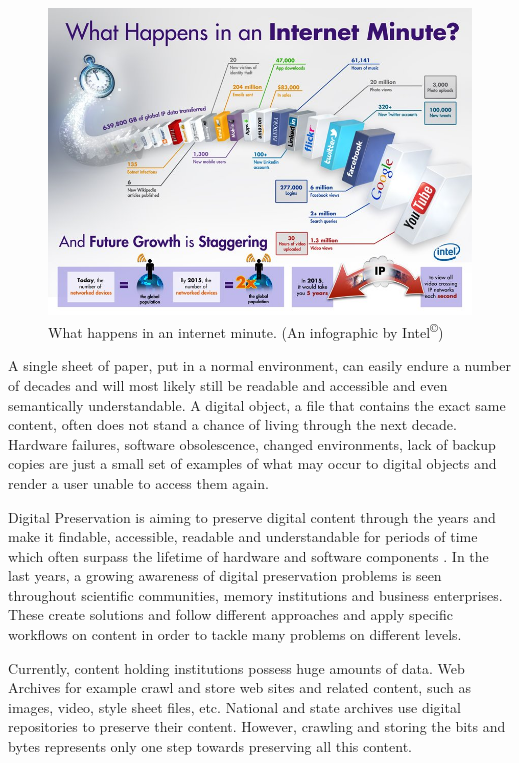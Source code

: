 \begin{figure}[th]
\begin{center}
\includegraphics[width=6in]{figures/introduction/intel_oneminute_internet.jpg}
\caption{What happens in an internet minute. (An infographic by Intel\textsuperscript{\copyright})}
\label{fig:intel_oneminute_internet}
\end{center}
\end{figure}

A single sheet of paper, put in a normal environment, can easily endure a number of decades and will most likely still be readable and accessible and even semantically understandable. A digital object, a file that contains the exact same content, often does not stand a chance of living through the next decade. Hardware failures, software obsolescence, changed environments, lack of backup copies are just a small set of examples of what may occur to digital objects and render a user unable to access them again.

Digital Preservation is aiming to preserve digital content through the years and make it findable, accessible, readable and understandable for periods of time which often surpass the lifetime of hardware and software components \cite{DBLP:journals/dlib/RosenthalRLRM05}. In the last years, a growing awareness of digital preservation problems is seen throughout scientific communities, memory institutions and business enterprises. These create solutions and follow different approaches and apply specific workflows on content in order to tackle many problems on different levels.

Currently, content holding institutions possess huge amounts of data. Web Archives for example crawl and store web sites and related content, such as images, video, style sheet files, etc. National and state archives use digital repositories to preserve their content. However, crawling and storing the bits and bytes represents only one step towards preserving all this content.

